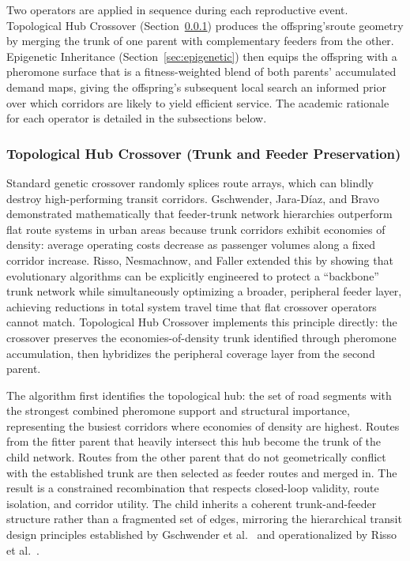 {{Two operators are applied in sequence during each reproductive event. Topological Hub Crossover (Section~\ref{sec:crossover}) produces the offspring'sroute geometry by merging the trunk of one parent with complementary feeders from the other. Epigenetic Inheritance (Section~\ref{sec:epigenetic}) then equips the offspring with a pheromone surface that is a fitness-weighted blend of both parents' accumulated demand maps, giving the offspring's subsequent local search an informed prior over which corridors are likely to yield efficient service. The academic rationale for each operator is detailed in the subsections below.

\subsubsection{Topological Hub Crossover (Trunk and Feeder Preservation)}
\label{sec:crossover}

Standard genetic crossover randomly splices route arrays, which can blindly destroy high-performing transit corridors. Gschwender, Jara-Díaz, and Bravo \citeyearpar{gschwender2016feeder} demonstrated mathematically that feeder-trunk network hierarchies outperform flat route systems in urban areas because trunk corridors exhibit economies of density: average operating costs decrease as passenger volumes along a fixed corridor increase. Risso, Nesmachnow, and Faller \citeyearpar{risso2023backbone} extended this by showing that evolutionary algorithms can be explicitly engineered to protect a ``backbone'' trunk network while simultaneously optimizing a broader, peripheral feeder layer, achieving reductions in total system travel time that flat crossover operators cannot match. Topological Hub Crossover implements this principle directly: the crossover preserves the economies-of-density trunk identified through pheromone accumulation, then hybridizes the peripheral coverage layer from the second parent.

The algorithm first identifies the topological hub: the set of road segments with the strongest combined pheromone support and structural importance, representing the busiest corridors where economies of density are highest. Routes from the fitter parent that heavily intersect this hub become the trunk of the child network. Routes from the other parent that do not geometrically conflict with the established trunk are then selected as feeder routes and merged in. The result is a constrained recombination that respects closed-loop validity, route isolation, and corridor utility. The child inherits a coherent trunk-and-feeder structure rather than a fragmented set of edges, mirroring the hierarchical transit design principles established by Gschwender et al.\ \citeyearpar{gschwender2016feeder} and operationalized by Risso et al.\ \citeyearpar{risso2023backbone}.

}}
